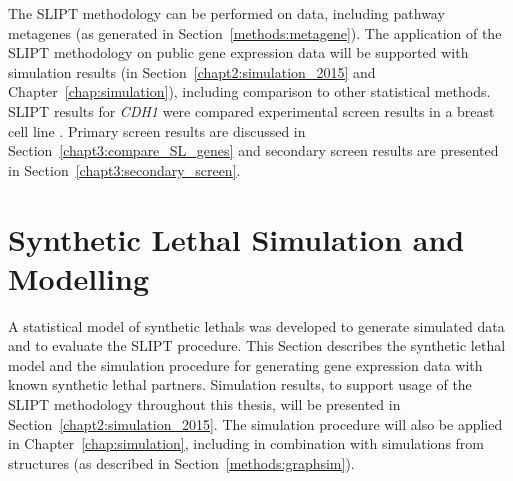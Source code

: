 The \gls{SLIPT} methodology can be performed on  data, including pathway \glspl{metagene} (as generated in Section~\ref{methods:metagene}). The application of the \gls{SLIPT} methodology on public \gls{gene expression} data will be supported with simulation results (in Section~\ref{chapt2:simulation_2015} and Chapter~\ref{chap:simulation}), including comparison to other statistical methods. \gls{SLIPT} results for \textit{CDH1} were compared experimental screen results in a breast cell line \citep{Telford2015}. Primary screen results are discussed in Section~\ref{chapt3:compare_SL_genes} and secondary screen results are presented in Section~\ref{chapt3:secondary_screen}.



\FloatBarrier

\section{Synthetic Lethal Simulation and Modelling} \label{methods:simulation_SL_expression} 

A statistical model of \glspl{synthetic lethal} was developed to generate simulated data and to evaluate the \gls{SLIPT} procedure. This Section describes the \gls{synthetic lethal} model and the simulation procedure for generating \gls{gene expression} data with known \gls{synthetic lethal} partners. Simulation results, to support usage of the \gls{SLIPT} methodology throughout this thesis, will be presented in Section~\ref{chapt2:simulation_2015}. The simulation procedure will also be applied in Chapter~\ref{chap:simulation}, including in combination with simulations from  structures (as described in Section~\ref{methods:graphsim}).

